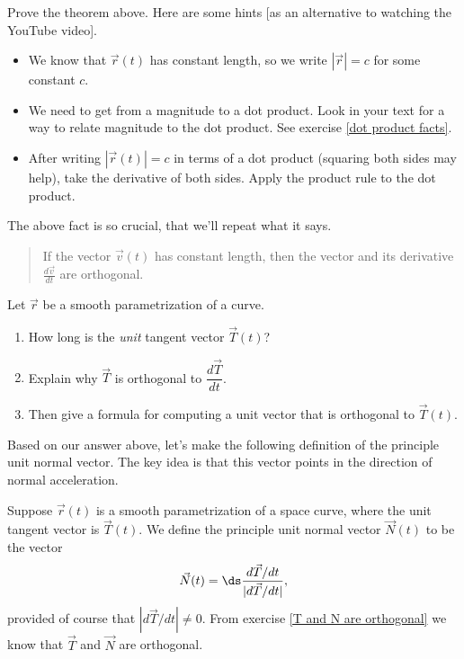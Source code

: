 \begin{problem}%
 Prove the theorem above. Here are some hints [as an alternative to watching the YouTube video].
\begin{itemize}
 \item We know that $\vec r(t)$ has constant length, so we write $|\vec r|=c$ for some constant $c$. 
 \item We need to get from a magnitude to a dot product. Look in your text for a way to relate magnitude to the dot product. See exercise \ref{dot product facts}.
 \item After writing $|\vec r(t)|=c$ in terms of a dot product (squaring both sides may help), take the derivative of both sides. Apply the product rule to the dot product.
\end{itemize}
\end{problem}

The above fact is so crucial, that we'll repeat what it says.
\begin{quote}
If the vector $\vec v(t)$ has constant length, then the vector and its derivative $\frac{d\vec v}{dt}$ are orthogonal.
\end{quote}


\begin{problem}\label{T and N are orthogonal}%
 Let $\vec r$ be a smooth parametrization of a curve.
\begin{enumerate}
	\item How long is the {\it unit} tangent vector $\vec T(t)$? 
	\item Explain why $\vec T$ is orthogonal to $\dfrac{d\vec T}{dt}$.
	\item Then give a formula for computing a unit vector that is orthogonal to $\vec T(t)$. 
\end{enumerate}
\end{problem}


Based on our answer above, let's make the following definition of the principle unit normal vector.  The key idea is that this vector points in the direction of normal acceleration. 
\begin{definition}
 Suppose $\vec r(t)$ is a smooth parametrization of a space curve, where the unit tangent vector is $\vec T(t)$.  
We define the principle unit normal vector $\vec N(t)$ to be the vector
 $$\vec N(t) = \ds\frac{d\vec T/dt}{|d\vec T/dt|},$$
 provided of course that $|d\vec T/dt|\neq 0$. 
 From exercise \ref{T and N are orthogonal} we know that $\vec T$ and $\vec N$ are orthogonal.
\end{definition}


